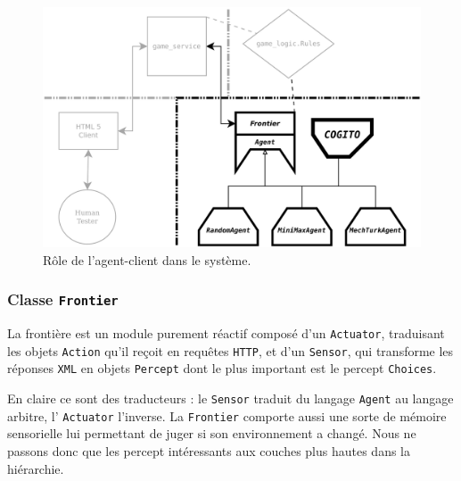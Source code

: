 \begin{figure}[H] 
\centering
\includegraphics[width=\textwidth]{files/william/archi_client_machine} 
\caption{Rôle de l'agent-client dans le système.} 
\end{figure}

\subsubsection{Classe \texttt{Frontier}}
La frontière est un module purement réactif composé d'un \texttt{Actuator}, traduisant les objets \texttt{Action} qu'il reçoit en requêtes \texttt{HTTP}, et d'un \texttt{Sensor}, qui transforme les réponses \texttt{XML} en objets \texttt{Percept} dont le plus important est le percept \texttt{Choices}.

En claire ce sont des traducteurs : le \texttt{Sensor} traduit du langage \texttt{Agent} au langage arbitre, l' \texttt{Actuator} l'inverse. La \texttt{Frontier} comporte aussi une sorte de mémoire sensorielle lui permettant de juger si son environnement a changé. Nous ne passons donc que les percept intéressants aux couches plus hautes dans la hiérarchie.  

